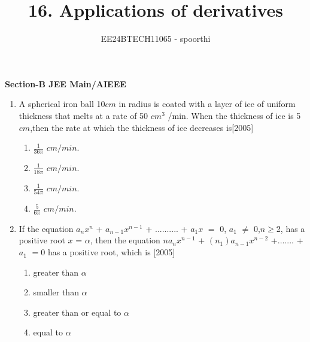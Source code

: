 \documentclass[journal,12pt,onecolumn]{IEEEtran}
\theoremstyle{remark}
\begin{document}



\title{16. Applications of derivatives}
\author{EE24BTECH11065 - spoorthi }
\newpage
\maketitle


\bigskip

\renewcommand{\thefigure}{\theenumi}
\renewcommand{\thetable}{\theenumi}
\begin{large}
\textbf{{Section-B JEE Main/AIEEE}}
\end{large}


\begin{enumerate}



    \item A spherical iron ball 10$cm$ in radius is coated with a layer of ice of uniform thickness that melts at a rate of 50 $cm^3$ /min. When the thickness of ice is 5$cm$,then the rate at which the thickness of ice decreases is\hfill[2005]
    \begin{multicols}{4}
    \begin{enumerate}
        \item 
        $\frac{1}{36\pi}$ $cm/min$.
        \item $\frac{1}{18\pi}$ $cm/min$.
        \item $\frac{1}{54\pi}$ $cm/min$.
        \item $\frac{5}{6\pi}$  $cm/min$.
        
    \end{enumerate}
    \end{multicols}

    
    \item If the equation $a_nx^n$ + $a$$_{n-1}x^{n-1}$ + .......... + $a_1$$x$ $=$ 0, $a_1$ $\ne$ 0,$n$$\geq$2, has a positive root $x$ = $\alpha$, then the equation $n$$a_n$$x^{n-1}$  $+$ $(n_1)$$a_{n-1}$$x^{n-2}$ +....... + $a_1$ $=$0 has a positive root, which is 
    \hfill[2005]
     
    \begin{enumerate}
    
        
    
    
        \item greater than $\alpha$
        \item smaller than $\alpha$
        \item greater than or equal to $\alpha$
        \item equal to $\alpha$
        

\end{enumerate}
\end{enumerate}
\end{document}
